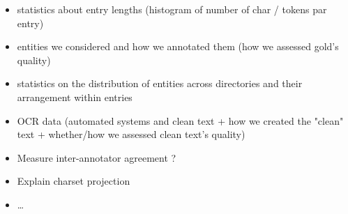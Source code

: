 \begin{itemize}
    \item statistics about entry lengths (histogram of number of char / tokens par entry)
    \item entities we considered and how we annotated them (how we assessed gold's quality)
    \item statistics on the distribution of entities across directories and their arrangement within entries
    \item OCR data (automated systems and clean text + how we created the "clean" text + whether/how we assessed clean text's quality)
    \item Measure inter-annotator agreement ? 
    \item Explain charset projection
    \item \dots
\end{itemize}
